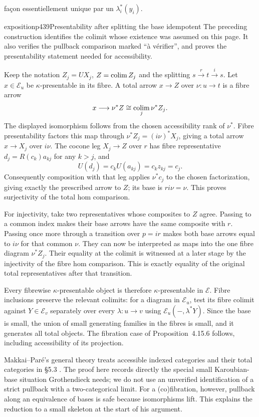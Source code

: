 façon essentiellement unique par un $\lambda^*_i(y_i)$.

\begin{dcomment}{exposition}{p439}{Presentability after splitting the base idempotent}
The preceding construction identifies the colimit whose existence was assumed on this page. It also verifies the pullback comparison marked ``\`a v\'erifier'', and proves the presentability statement needed for accessibility.

Keep the notation $Z_j=UX_j$, $Z=\mathop{\rm colim}Z_j$ and the splitting $s\xrightarrow r t\xrightarrow i s$. Let $x\in\mathcal E_u$ be $\kappa$-presentable in its fibre. A total arrow $x\to Z$ over $\nu:u\to t$ is a fibre arrow
\[
 x\longrightarrow\nu^*Z
       \cong\mathop{\rm colim}_j\nu^*Z_j.
\]
The displayed isomorphism follows from the chosen accessibility rank of $\nu^*$. Fibre presentability factors this map through $\nu^*Z_j=(i\nu)^*X_j$, giving a total arrow $x\to X_j$ over $i\nu$. The cocone leg $X_j\to Z$ over $r$ has fibre representative $d_j=R(c_k)a_{kj}$ for any $k>j$, and
\[
 U(d_j)=c_kU(a_{kj})=c_kz_{kj}=c_j.
\]
Consequently composition with that leg applies $\nu^*c_j$ to the chosen factorization, giving exactly the prescribed arrow to $Z$; its base is $ri\nu=\nu$. This proves surjectivity of the total hom comparison.

For injectivity, take two representatives whose composites to $Z$ agree. Passing to a common index makes their base arrows have the same composite with $r$. Passing once more through a transition over $p=ir$ makes both base arrows equal to $i\nu$ for that common $\nu$. They can now be interpreted as maps into the one fibre diagram $\nu^*Z_j$. Their equality at the colimit is witnessed at a later stage by the injectivity of the fibre hom comparison. This is exactly equality of the original total representatives after that transition.

Every fibrewise $\kappa$-presentable object is therefore $\kappa$-presentable in $\mathcal E$. Fibre inclusions preserve the relevant colimits: for a diagram in $\mathcal E_u$, test its fibre colimit against $Y\in\mathcal E_v$ separately over every $\lambda:u\to v$ using $\mathcal E_u(-,\lambda^*Y)$. Since the base is small, the union of small generating families in the fibres is small, and it generates all total objects. The fibration case of Proposition~4.15.6 follows, including accessibility of its projection.

Makkai--Par\'e's general theory treats accessible indexed categories and their total categories in \S5.3 \citep{MakkaiPare1989}. The proof here records directly the special small Karoubian-base situation Grothendieck needs; we do not use an unverified identification of a strict pullback with a two-categorical limit. For a (co)fibration, however, pullback along an equivalence of bases is safe because isomorphisms lift. This explains the reduction to a small skeleton at the start of his argument.
\end{dcomment}


